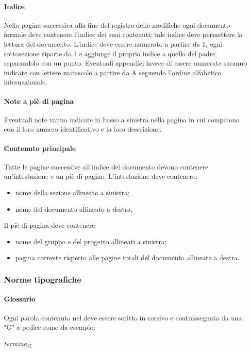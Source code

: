                 \paragraph{Indice}
                Nella pagina successiva alla fine del registro delle modifiche ogni documento formale deve contenere l'indice dei suoi contenuti; tale indice deve permettere la lettura  del documento. L'indice deve essere numerato a partire da 1, ogni sottosezione riparte da 1 e aggiunge il proprio indice a quello del padre separandolo con un punto. Eventuali appendici invece di essere numerate saranno indicate con lettere maiuscole a partire da A seguendo l'ordine alfabetico internazionale.
                \paragraph{Note a piè di pagina}
                Eventuali note vanno indicate in basso a sinistra nella pagina in cui compaiono con il loro numero identificativo e la loro descrizione.
                \paragraph{Contenuto principale}
                Tutte le pagine successive all'indice del documento devono contenere un'intestazione e un piè di pagina.
                L'intestazione deve contenere:
                \begin{itemize}
                    \item nome della sezione allineato a sinistra;
                    \item nome del documento allineato a destra.
                \end{itemize}
                Il piè di pagina deve contenere:
                \begin{itemize}
                    \item nome del gruppo e del progetto allineati a sinistra;
                    \item pagina corrente rispetto alle pagine totali del documento allineate a destra.
                \end{itemize}
        \subsubsection{Norme tipografiche} \label{sec:normeTipografiche}
                \paragraph{Glossario}
                Ogni parola contenuta nel \gl{} deve essere scritta in corsivo e contrassegnata da una "G" a pedice come da esempio:\\
                \centerline{\textit{termine\textsubscript{G}}}
                

